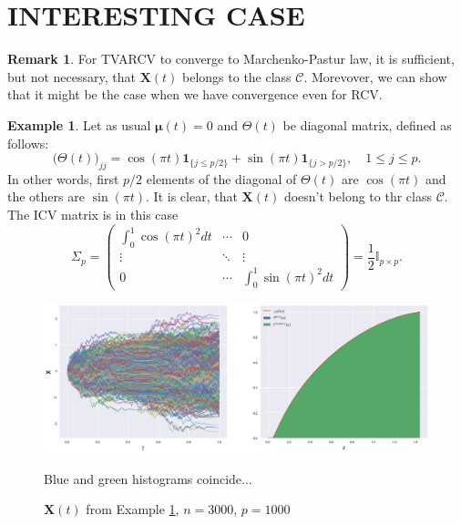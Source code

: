 \documentclass[a4paper,11pt]{article}
\theoremstyle{plain}
\theoremstyle{definition}
\newtheorem{exmp}[thm]{Example}
\newtheorem{rmrk}[thm]{Remark}
\begin{document}
    \section*{INTERESTING CASE}
    \begin{rmrk}
    	For TVARCV to converge to Marchenko-Pastur law, it is sufficient, but not necessary, that $\mathbf{X}(t)$ belongs to  the class $\mathcal{C}$. Morevover, we can show that it might be the case when we have convergence even for RCV.
    \end{rmrk}
    \begin{exmp} \label{counter exmpl}
    	Let as usual $\boldsymbol{\mu}(t) =0$ and $\Theta(t)$ be diagonal matrix, defined as follows:
    	\[ \Big(\Theta(t)\Big)_{jj} = \cos(\pi t) \mathbf{1}_{\{j \leq p/2\}} + \sin(\pi t) \mathbf{1}_{\{j > p/2\}}, \quad 1 \leq j \leq p.  \]
    	In other words, first $p/2$ elements of the diagonal of $\Theta(t)$ are $\cos(\pi t)$ and the others are $\sin(\pi t)$. It is clear, that $\mathbf{X}(t)$ doesn't belong to thr class $\mathcal{C}$. The ICV matrix is in this case
    	\[ \Sigma_p = \begin{pmatrix}
    	\int_{0}^{1} \cos(\pi t)^2 dt & \cdots & 0 \\
    	\vdots & \ddots & \vdots \\
    	0 & \cdots & \int_{0}^{1} \sin(\pi t)^2 dt
    	\end{pmatrix} 
    	= \frac{1}{2} \mathbb{I}_{p \times p}. \]
    \end{exmp}
    
    \begin{figure}
    	\begin{center} \centering
    		\includegraphics[scale=0.4]{counter}
    		\caption{ $\mathbf{X}(t)$ from Example \ref{counter exmpl}, $n = 3000$, $p=1000$ }
    		\smallskip
    		\small
    		Blue and green histograms coincide...
    	\end{center}
    \end{figure}
    
\end{document}
